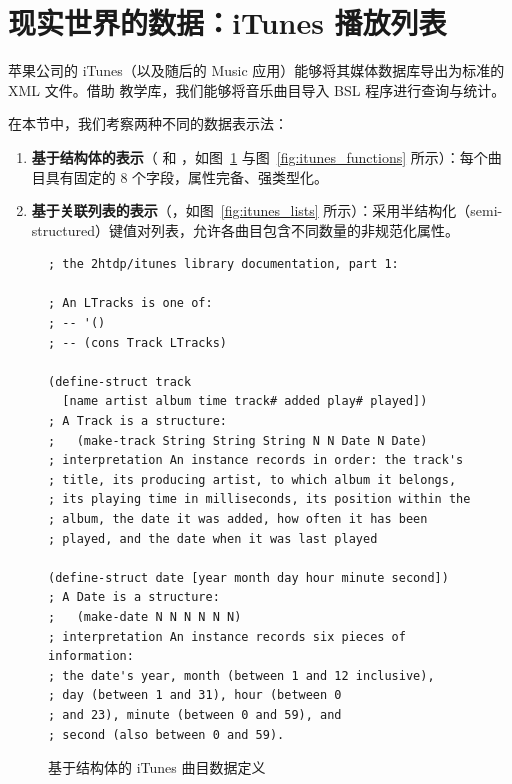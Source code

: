 \section{现实世界的数据：iTunes 播放列表}
\label{sec:ch12_itunes}

苹果公司的 iTunes（以及随后的 Music 应用）能够将其媒体数据库导出为标准的 XML 文件。借助  教学库，我们能够将音乐曲目导入 BSL 程序进行查询与统计。

在本节中，我们考察两种不同的数据表示法：
\begin{enumerate}
  \item \textbf{基于结构体的表示}（ 和 ，如图~\ref{fig:itunes_structures} 与图~\ref{fig:itunes_functions} 所示）：每个曲目具有固定的 8 个字段，属性完备、强类型化。
  \item \textbf{基于关联列表的表示}（，如图~\ref{fig:itunes_lists} 所示）：采用半结构化（semi-structured）键值对列表，允许各曲目包含不同数量的非规范化属性。
\end{enumerate}

\begin{figure}[htbp]
  \centering
\begin{lstlisting}[language=BSL, basicstyle=\scriptsize\ttfamily]
; the 2htdp/itunes library documentation, part 1:

; An LTracks is one of:
; -- '()
; -- (cons Track LTracks)

(define-struct track
  [name artist album time track# added play# played])
; A Track is a structure:
;   (make-track String String String N N Date N Date)
; interpretation An instance records in order: the track's
; title, its producing artist, to which album it belongs,
; its playing time in milliseconds, its position within the
; album, the date it was added, how often it has been
; played, and the date when it was last played

(define-struct date [year month day hour minute second])
; A Date is a structure:
;   (make-date N N N N N N)
; interpretation An instance records six pieces of information:
; the date's year, month (between 1 and 12 inclusive),
; day (between 1 and 31), hour (between 0
; and 23), minute (between 0 and 59), and
; second (also between 0 and 59).
\end{lstlisting}
  \caption{基于结构体的 iTunes 曲目数据定义}
  \label{fig:itunes_structures}
\end{figure}

